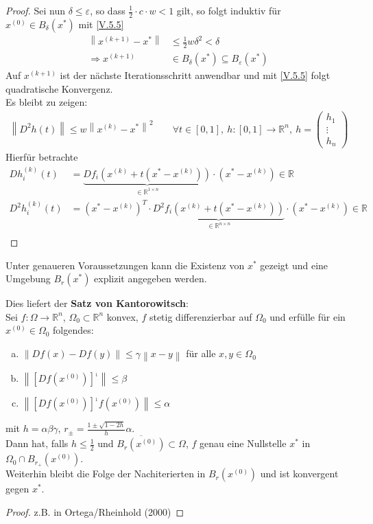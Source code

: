 \documentclass[ngerman,fontsize=11pt, paper=a4, parskip=half, titlepage=true, toc=bib]{scrbook}
\newcommand{\R}{\mathds{R}}
\newcommand{\Ren}{\mathds{R}^{n}}
\newcommand{\nn}[1]{\left\| #1 \right\|}
\begin{document}
\begin{proof}
 			Sei nun $\delta \leq \varepsilon$, so dass $\frac{1}{2} \cdot c\cdot w <1$ gilt,
 			so folgt induktiv für $x^{(0)}\in B_\delta(x^{*})$ mit \eqref{V.5.5}
 			\begin{align*}
 				\nn{x^{(k+1)}-x^{*}} &\leq \frac{1}{2}w\delta^2 < \delta\\
 				\Rightarrow x^{(k+1)}&\in B_\delta(x^{*})\subseteq B_\varepsilon(x^{*})
 			\end{align*}
 			Auf $x^{(k+1)} $ ist der nächste Iterationsschritt anwendbar
 			und mit \eqref{V.5.5} folgt quadratische Konvergenz.\\
 			Es bleibt zu zeigen:
 			\begin{gather*}
 				\nn{D^2h(t)} \leq w\nn{x^{(k)}-x^{*}}^2 \qquad \forall t\in [0,1],~
 				h:[0,1]\rightarrow\Ren,~ h=\begin{pmatrix} h_1 \\ \vdots \\ h_n \end{pmatrix}
 			\end{gather*}
 			Hierfür betrachte
 			\begin{align*}
 				Dh_i^{(k)}(t)&=\underbrace{Df_i\left( x^{(k)}+t(x^{*}-x^{(k)})\right)}_{\in \R^{1\times n}}
 							\cdot (x^{*}-x^{(k)})\in\R\\
 				D^2h_i^{(k)}(t)&=(x^{*}-x^{(k)})^T\cdot
 							\underbrace{D^2f_i\left( x^{(k)}+t(x^{*}-x^{(k)})\right)}_{\in \R^{n\times n}}
 							\cdot (x^{*}-x^{(k)})\in\R\\
 			\end{align*}
 		\end{proof}
 		
 		Unter genaueren Voraussetzungen kann die Existenz von $x^{*}$ gezeigt 
 		und eine Umgebung $B_r(x^{*})$ explizit angegeben werden.
 		
 		Dies liefert der \textbf{Satz von Kantorowitsch}:\\
 		Sei $f:\Omega\rightarrow \Ren$, $\Omega_0 \subset \Ren$ konvex,
 		 $f$ stetig differenzierbar auf $\Omega_0$ und 
 		 erfülle für ein $x^{(0)}\in \Omega_0$ folgendes:
 		 \begin{enumerate}[a)]
 		 	\item $\nn{Df(x) -Df(y)}\leq \gamma \nn{x-y}$ für alle $x,y\in \Omega_0$
 		 	\item $\nn{[Df(x^{(0)})]^{_1}} \leq \beta$
 		 	\item $\nn{[Df(x^{(0)})]^{_1}f(x^{(0)})} \leq \alpha$
 		 \end{enumerate}
 		 mit $h=\alpha\beta\gamma$, $r_\pm = \frac{1\pm \sqrt{1-2h}}{h}\alpha$.\\
 		 Dann hat, falls $h\leq \frac{1}{2}$ und $\overline{B_r(x^{(0)})}\subset \Omega$,
 		 $f$ genau eine Nullstelle $x^{*}$ in $\Omega_0\cap B_{r_+}(x^{(0)})$.\\
 		 Weiterhin bleibt die Folge der Nachiterierten in $B_r(x^{(0)})$
 		 und ist konvergent gegen $x^{*}$.
 		\begin{proof}
 			z.B. in Ortega/Rheinhold (2000)
 		\end{proof}
 		
\end{document}
